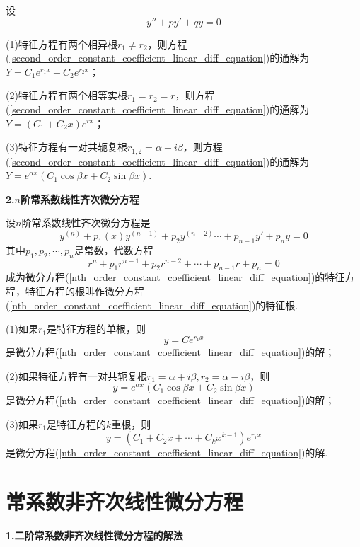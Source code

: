 设
\begin{equation}
    y''+py'+qy=0 \label{second_order_constant_coefficient_linear_diff_equation}
\end{equation}

(1)特征方程有两个相异根$r_1\neq r_2$，则方程(\ref{second_order_constant_coefficient_linear_diff_equation})的通解为$Y=C_1e^{r_1x}+C_2e^{r_2x}$；

(2)特征方程有两个相等实根$r_1=r_2=r$，则方程(\ref{second_order_constant_coefficient_linear_diff_equation})的通解为$Y=(C_1+C_2x)e^{rx}$；

(3)特征方程有一对共轭复根$r_{1,2}=\alpha\pm i\beta$，则方程(\ref{second_order_constant_coefficient_linear_diff_equation})的通解为$Y=e^{\alpha x}(C_1\cos\beta x+C_2\sin\beta x)$.

\textbf{2.$n$阶常系数线性齐次微分方程}

设$n$阶常系数线性齐次微分方程是
\begin{equation}
    y^{(n)}+p_1(x)y^{(n-1)}+p_2y^{(n-2)}\cdots+p_{n-1}y'+p_ny=0
    \label{nth_order_constant_coefficient_linear_diff_equation}
\end{equation}
其中$p_1,p_2,\cdots,p_n$是常数，代数方程
\begin{equation*}
    r^n+p_1r^{n-1}+p_2r^{n-2}+\cdots+p_{n-1}r+p_n=0
\end{equation*}
成为微分方程(\ref{nth_order_constant_coefficient_linear_diff_equation})的特征方程，特征方程的根叫作微分方程(\ref{nth_order_constant_coefficient_linear_diff_equation})的特征根.

(1)如果$r_1$是特征方程的单根，则
\begin{equation*}
    y=Ce^{r_1x}
\end{equation*}
是微分方程(\ref{nth_order_constant_coefficient_linear_diff_equation})的解；

(2)如果特征方程有一对共轭复根$r_1=\alpha+i\beta,r_2=\alpha-i\beta$，则
\begin{equation*}
    y=e^{\alpha x}(C_1\cos\beta x+C_2\sin\beta x)
\end{equation*}
是微分方程(\ref{nth_order_constant_coefficient_linear_diff_equation})的解；

(3)如果$r_1$是特征方程的$k$重根，则
\begin{equation*}
    y=(C_1+C_2x+\cdots+C_kx^{k-1})e^{r_1x}
\end{equation*}
是微分方程(\ref{nth_order_constant_coefficient_linear_diff_equation})的解.

\section{常系数非齐次线性微分方程}
\textbf{1.二阶常系数非齐次线性微分方程的解法}

